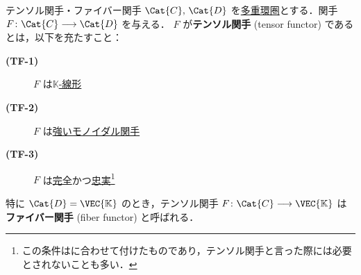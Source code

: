 \documentclass[TQFT_main]{subfiles}
\begin{document}
\begin{mydef}[label=def:tensor-functor]{テンソル関手・ファイバー関手}
    $\Cat{C},\, \Cat{D}$ を\hyperref[def:ringcat]{多重環圏}とする．関手 $F \colon \Cat{C} \lto \Cat{D}$ を与える．
    $F$ が\textbf{テンソル関手} (tensor functor) であるとは，以下を充たすこと：
    \begin{description}
        \item[\textbf{(TF-1)}] $F$ は\hyperref[def:additive-exact]{$\mathbb{K}$-線形}
        \item[\textbf{(TF-2)}] $F$ は\hyperref[redef:monidal-functor]{強いモノイダル関手}
        \item[\textbf{(TF-3)}] $F$ は\hyperref[def:additive-exact]{完全}かつ\hyperref[def:faithful]{忠実}\footnote{この条件は\cite[DEFINITION 4.2.5., p.66]{etingof2015tensor}に合わせて付けたものであり，テンソル関手と言った際には必要とされないことも多い．}
    \end{description}
    特に $\Cat{D} = \VEC{\mathbb{K}}$ のとき，テンソル関手 $F \colon \Cat{C} \lto \VEC{\mathbb{K}}$ は\textbf{ファイバー関手} (fiber functor) と呼ばれる．
\end{mydef}
\end{document}
